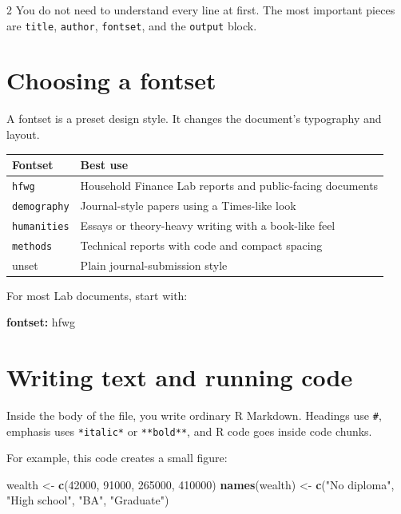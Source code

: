 \documentclass[12pt]{article}
\newenvironment{Shaded}{\begin{snugshade}}{\end{snugshade}}
\newcommand{\AttributeTok}[1]{\textcolor[rgb]{0.13,0.29,0.53}{#1}}
\newcommand{\DecValTok}[1]{\textcolor[rgb]{0.00,0.00,0.81}{#1}}
\newcommand{\FunctionTok}[1]{\textcolor[rgb]{0.13,0.29,0.53}{\textbf{#1}}}
\newcommand{\KeywordTok}[1]{\textcolor[rgb]{0.13,0.29,0.53}{\textbf{#1}}}
\newcommand{\NormalTok}[1]{#1}
\newcommand{\OtherTok}[1]{\textcolor[rgb]{0.56,0.35,0.01}{#1}}
\newcommand{\StringTok}[1]{\textcolor[rgb]{0.31,0.60,0.02}{#1}}
\renewenvironment{Shaded}{%
    \vspace{3pt}%
    \noindent\begin{minipage}{\linewidth}%
    \def\FrameCommand{%
      \hspace{1pt}%
      {\color{hfwgrule}\vrule width 3pt}%
      \hspace{4pt}%
      \colorbox{codeinputbg}%
    }%
    \MakeFramed{\advance\hsize by -\width \FrameRestore}%
    \footnotesize
    \setlength{\parskip}{0pt}%
    \setlength{\partopsep}{0pt}%
  }{%
    \endMakeFramed
    \end{minipage}%
    \vspace{3pt}%
  }
\def\FrameCommand{\fboxsep=4pt\colorbox{codeoutputbg}}%
\begin{document}
\begin{multicols}{2}
You do not need to understand every line at first. The most important
pieces are \texttt{title}, \texttt{author}, \texttt{fontset}, and the
\texttt{output} block.

\section{Choosing a fontset}\label{choosing-a-fontset}

A fontset is a preset design style. It changes the document's typography
and layout.

{\def\LTcaptype{} %
\begin{longtable}[]{@{}ll@{}}
\toprule\noalign{}
Fontset & Best use \\
\midrule\noalign{}
\endhead
\bottomrule\noalign{}
\endlastfoot
\texttt{hfwg} & Household Finance Lab reports and public-facing
documents \\
\texttt{demography} & Journal-style papers using a Times-like look \\
\texttt{humanities} & Essays or theory-heavy writing with a book-like
feel \\
\texttt{methods} & Technical reports with code and compact spacing \\
unset & Plain journal-submission style \\
\end{longtable}
}

For most Lab documents, start with:

\begin{Shaded}
\begin{Highlighting}[]
\FunctionTok{fontset}\KeywordTok{:}\AttributeTok{ hfwg}
\end{Highlighting}
\end{Shaded}

\section{Writing text and running
code}\label{writing-text-and-running-code}

Inside the body of the file, you write ordinary R Markdown. Headings use
\texttt{\#}, emphasis uses \texttt{*italic*} or \texttt{**bold**}, and R
code goes inside code chunks.

For example, this code creates a small figure:

\begin{Shaded}
\begin{Highlighting}[]
\NormalTok{wealth }\OtherTok{\textless{}{-}} \FunctionTok{c}\NormalTok{(}\DecValTok{42000}\NormalTok{, }\DecValTok{91000}\NormalTok{, }\DecValTok{265000}\NormalTok{, }\DecValTok{410000}\NormalTok{)}
\FunctionTok{names}\NormalTok{(wealth) }\OtherTok{\textless{}{-}} \FunctionTok{c}\NormalTok{(}\StringTok{"No diploma"}\NormalTok{, }\StringTok{"High school"}\NormalTok{, }\StringTok{"BA"}\NormalTok{, }\StringTok{"Graduate"}\NormalTok{)}


\end{Highlighting}
\end{Shaded}
\end{multicols}
\end{document}
